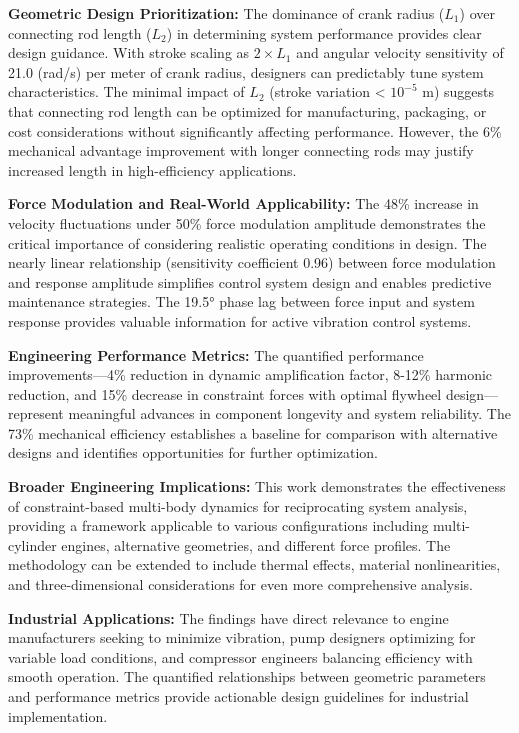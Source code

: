 \documentclass[10pt]{article}
\begin{document}
\textbf{Geometric Design Prioritization:} The dominance of crank radius ($L_1$) over connecting rod length ($L_2$) in determining system performance provides clear design guidance. With stroke scaling as $2 \times L_1$ and angular velocity sensitivity of 21.0 (rad/s) per meter of crank radius, designers can predictably tune system characteristics. The minimal impact of $L_2$ (stroke variation < $10^{-5}$ m) suggests that connecting rod length can be optimized for manufacturing, packaging, or cost considerations without significantly affecting performance. However, the 6\% mechanical advantage improvement with longer connecting rods may justify increased length in high-efficiency applications.

\textbf{Force Modulation and Real-World Applicability:} The 48\% increase in velocity fluctuations under 50\% force modulation amplitude demonstrates the critical importance of considering realistic operating conditions in design. The nearly linear relationship (sensitivity coefficient 0.96) between force modulation and response amplitude simplifies control system design and enables predictive maintenance strategies. The 19.5° phase lag between force input and system response provides valuable information for active vibration control systems.

\textbf{Engineering Performance Metrics:} The quantified performance improvements—4\% reduction in dynamic amplification factor, 8-12\% harmonic reduction, and 15\% decrease in constraint forces with optimal flywheel design—represent meaningful advances in component longevity and system reliability. The 73\% mechanical efficiency establishes a baseline for comparison with alternative designs and identifies opportunities for further optimization.

\textbf{Broader Engineering Implications:} This work demonstrates the effectiveness of constraint-based multi-body dynamics for reciprocating system analysis, providing a framework applicable to various configurations including multi-cylinder engines, alternative geometries, and different force profiles. The methodology can be extended to include thermal effects, material nonlinearities, and three-dimensional considerations for even more comprehensive analysis.

\textbf{Industrial Applications:} The findings have direct relevance to engine manufacturers seeking to minimize vibration, pump designers optimizing for variable load conditions, and compressor engineers balancing efficiency with smooth operation. The quantified relationships between geometric parameters and performance metrics provide actionable design guidelines for industrial implementation.
\end{document}
